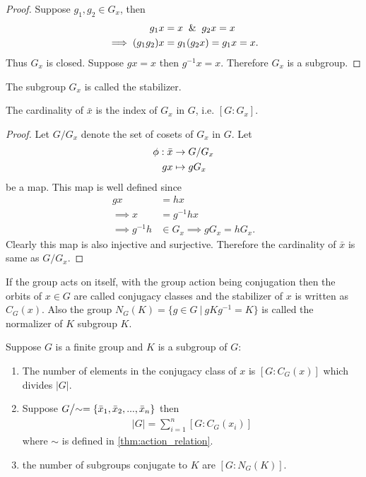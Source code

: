 \begin{proof}
  Suppose $g_1,g_2 \in G_x$, then
  \begin{align*}
    g_1 x &= x \And g_2 x = x\\
    \implies (g_1g_2)x &= g_1(g_2 x) = g_1 x = x.  
  \end{align*}
  Thus $G_x$ is closed. Suppose $gx=x$ then $g^{-1}x = x$. Therefore $G_x$ is a subgroup.
\end{proof}
\begin{definition}
  The subgroup $G_x$ is called the stabilizer.
\end{definition}
\begin{proposition}
  The cardinality of $\bar{x}$ is the index of $G_x$ in $G$, i.e. $[G:G_x]$.
\end{proposition}
\begin{proof}
  Let $G/G_x$ denote the set of cosets of $G_x$ in $G$. Let
  \begin{align*}
    \phi: \bar{x} &\to G/G_x\\
    gx &\mapsto gG_x
  \end{align*}
  be a map. This map is well defined since
  \begin{align*}
    gx &= hx\\
    \implies x &= g^{-1}h x \\
    \implies g^{-1}h &\in G_x \implies gG_x = hG_x.
  \end{align*}
  Clearly this map is also injective and surjective. Therefore the cardinality of $\bar{x}$ is same as $G/G_x$.
\end{proof}
\begin{definition}
  If the group acts on itself, with the group action being conjugation then the orbits of $x\in G$ are called conjugacy classes and the stabilizer of $x$ is written as $C_G(x)$. Also the group $N_G(K) = \{g\in G\ |\ gKg^{-1} = K\}$ is called the normalizer of $K$ subgroup $K$.
\end{definition}
\begin{corollary}\label{cor:class_eq}
  Suppose $G$ is a finite group and $K$ is a subgroup of $G$:
  \begin{enumerate}
    \item The number of elements in the conjugacy class of $x$ is $[G:C_G(x)]$ which divides $|G|$.
    \item Suppose $G\bign/ \sim = \{\bar{x}_1, \bar{x}_2,...,\bar{x}_n \}$ then
      \begin{align*}
        |G| = \sum_{i=1}^n [G:C_G(x_i)]
      \end{align*}
      where $\sim$ is defined in \cref{thm:action_relation}.
    \item the number of subgroups conjugate to $K$ are $[G:N_G(K)]$.
  \end{enumerate}
\end{corollary}
